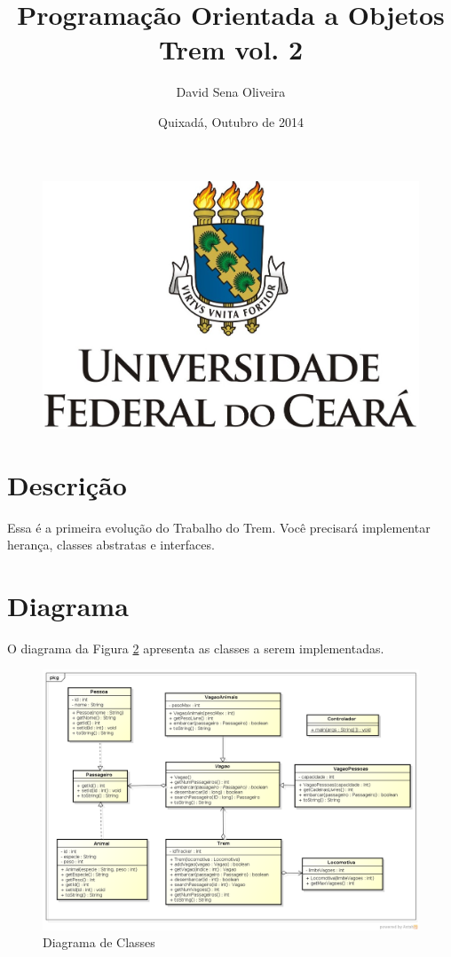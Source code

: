 \documentclass[12pt]{article}
\title{Programação Orientada a Objetos \\ Trem vol. 2}
\author{David Sena Oliveira}
\date{Quixadá, Outubro de 2014}
\begin{document}
\begin{figure}
\centering
\includegraphics[width=0.4\linewidth]{ufc}
\label{fig:ufc}
\end{figure}

\maketitle

\section{Descrição}

Essa é a primeira evolução do Trabalho do Trem. Você precisará implementar herança, 
classes abstratas e interfaces.

\section{Diagrama}

O diagrama da Figura \ref{fig:diagrama} apresenta as classes a serem implementadas.
\begin{landscape}
\begin{figure}
\centering
\includegraphics[width=1\linewidth]{./diagrama}
\caption{Diagrama de Classes}
\label{fig:diagrama}
\end{figure}
\end{landscape}
\end{document}
